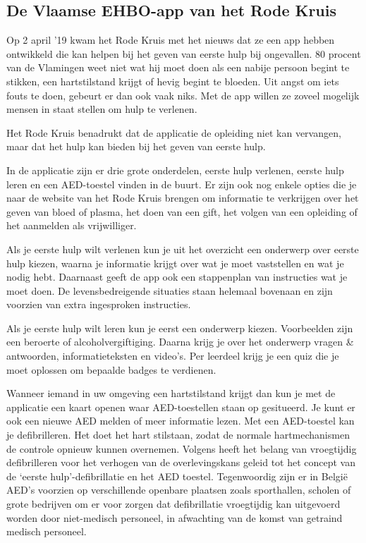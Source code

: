 \subsection{De Vlaamse EHBO-app van het Rode Kruis}
\label{ss:de vlaamse ehbo-app van het rode kruis}
Op 2 april ’19 kwam het Rode Kruis met het nieuws dat ze een app hebben ontwikkeld die kan helpen bij het geven van eerste hulp bij ongevallen. 80 procent van de Vlamingen weet niet wat hij moet doen als een nabije persoon begint te stikken, een hartstilstand krijgt of hevig begint te bloeden. Uit angst om iets fouts te doen, gebeurt er dan ook vaak niks. Met de app willen ze zoveel mogelijk mensen in staat stellen om hulp te verlenen. \autocite{Decroubele2019}

Het Rode Kruis benadrukt dat de applicatie de opleiding niet kan vervangen, maar dat het hulp kan bieden bij het geven van eerste hulp.

In de applicatie zijn er drie grote onderdelen, eerste hulp verlenen, eerste hulp leren en een \gls{AED}-toestel vinden in de buurt. Er zijn ook nog enkele opties die je naar de website van het Rode Kruis brengen om informatie te verkrijgen over het geven van bloed of plasma, het doen van een gift, het volgen van een opleiding of het aanmelden als vrijwilliger.

Als je eerste hulp wilt verlenen kun je uit het overzicht een onderwerp over eerste hulp kiezen, waarna je informatie krijgt over wat je moet vaststellen en wat je nodig hebt. Daarnaast geeft de app ook een stappenplan van instructies wat je moet doen. De levensbedreigende situaties staan helemaal bovenaan en zijn voorzien van extra ingesproken instructies.

Als je eerste hulp wilt leren kun je eerst een onderwerp kiezen. Voorbeelden zijn een beroerte of alcoholvergiftiging. Daarna krijg je over het onderwerp vragen \& antwoorden, informatieteksten en video's. Per leerdeel krijg je een quiz die je moet oplossen om bepaalde badges te verdienen.

Wanneer iemand in uw omgeving een hartstilstand krijgt dan kun je met de applicatie een kaart openen waar \gls{AED}-toestellen staan op gesitueerd. Je kunt er ook een nieuwe \gls{AED} melden of meer informatie lezen. Met een \gls{AED}-toestel kan je defibrilleren. Het doet het hart stilstaan, zodat de normale hartmechanismen de controle opnieuw kunnen overnemen. \autocite{Gezondheidbe2018} Volgens \textcite{Koster1999} heeft het belang van vroegtijdig defibrilleren voor het verhogen van de overlevingskans geleid tot het concept van de ‘eerste hulp’-defibrillatie en het \gls{AED} toestel. Tegenwoordig zijn er in België \gls{AED}’s voorzien op verschillende openbare plaatsen zoals sporthallen, scholen of grote bedrijven om er voor zorgen dat defibrillatie vroegtijdig kan uitgevoerd worden door niet-medisch personeel, in afwachting van de komst van getraind medisch personeel.

